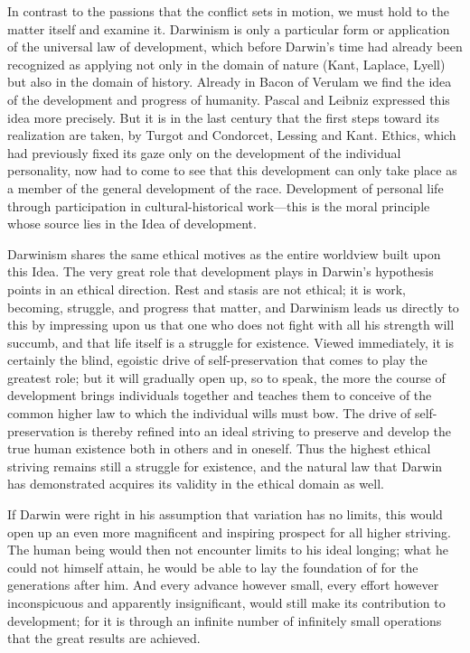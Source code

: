 \documentclass[12pt,a4paper]{article}
\begin{document}
In contrast to the passions that the conflict sets in motion, we must
hold to the matter itself and examine it. Darwinism is only a
particular form or application of the universal law of development,
which before Darwin's time had already been recognized as applying
not only in the domain of nature (Kant, Laplace, Lyell) but also in
the domain of history. Already in Bacon of Verulam we find the idea
of the development and progress of humanity. Pascal and Leibniz
expressed this idea more precisely. But it is in the last century that
the first steps toward its realization are taken, by Turgot and
Condorcet, Lessing and Kant. Ethics, which had previously fixed its
gaze only on the development of the individual personality, now had
to come to see that this development can only take place as a member
of the general development of the race. Development of personal life
through participation in cultural-historical work---this is the moral
principle whose source lies in the Idea of development.

Darwinism shares the same ethical motives as the entire worldview
built upon this Idea. The very great role that development plays in
Darwin's hypothesis points in an ethical direction. Rest and stasis
are not ethical; it is work, becoming, struggle, and progress that
matter, and Darwinism leads us directly to this by impressing upon us
that one who does not fight with all his strength will succumb, and
that life itself is a struggle for existence. Viewed immediately, it
is certainly the blind, egoistic drive of self-preservation that comes
to play the greatest role; but it will gradually open up, so to speak,
the more the course of development brings individuals together and
teaches them to conceive of the common higher law to which the
individual wills must bow. The drive of self-preservation is thereby
refined into an ideal striving to preserve and develop the true human
existence both in others and in oneself. Thus the highest ethical
striving remains still a struggle for existence, and the natural law
that Darwin has demonstrated acquires its validity in the ethical
domain as well.

If Darwin were right in his assumption that variation has no limits,
this would open up an even more magnificent and inspiring prospect for
all higher striving. The human being would then not encounter limits
to his ideal longing; what he could not himself attain, he would be
able to lay the foundation of for the generations after him. And
every advance however small, every effort however inconspicuous and
apparently insignificant, would still make its contribution to
development; for it is through an infinite number of infinitely small
operations that the great results are achieved.
\end{document}
